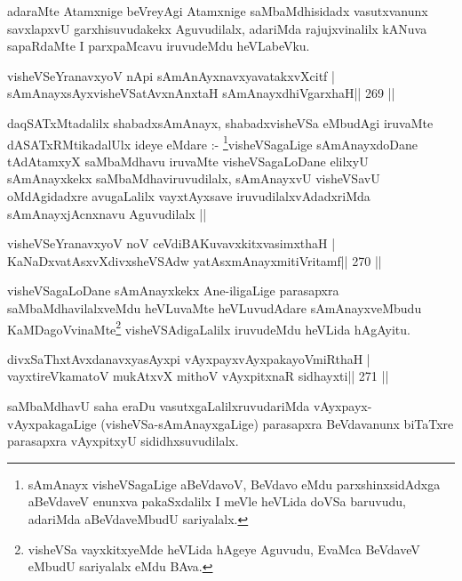 \begin{artha}
adaraMte Atamxnige beVreyAgi Atamxnige saMbaMdhisidadx vasutxvanunx savxlapxvU garxhisuvudakekx Aguvudilalx, adariMda rajujxvinalilx kANuva sapaRdaMte I parxpaMcavu iruvudeMdu heVLabeVku.
\end{artha}

\begin{shl}
visheVSeYranavxyoV nApi sAmAnAyxnavxyavatakxvXcitf |
sAmAnayxsAyxvisheVSatAvxnAnxtaH sAmAnayxdhiVgarxhaH\hfill || 269 ||
\end{shl}

\begin{artha}
daqSATxMtadalilx shabadxsAmAnayx, shabadxvisheVSa eMbudAgi iruvaMte dASATxRMtikadalUlx ideye eMdare :- \footnote[1]{sAmAnayx visheVSagaLige aBeVdavoV, BeVdavo eMdu parxshinxsidAdxga aBeVdaveV enunxva pakaSxdalilx I meVle heVLida doVSa baruvudu, adariMda aBeVdaveMbudU sariyalalx.}visheVSagaLige sAmAnayxdoDane tAdAtamxyX saMbaMdhavu iruvaMte visheVSagaLoDane elilxyU sAmAnayxkekx saMbaMdhaviruvudilalx, sAmAnayxvU visheVSavU oMdAgidadxre avugaLalilx vayxtAyxsave iruvudilalxvAdadxriMda sAmAnayxjAcnxnavu Aguvudilalx || 
\end{artha}


\begin{shl}
visheVSeYranavxyoV noV ceVdiBAKuvavxkitxvasimxthaH |
KaNaDxvatAsxvXdivxsheVSAdw yatAsxmAnayxmitiVritamf\hfill || 270 ||
\end{shl}

\begin{artha}
visheVSagaLoDane sAmAnayxkekx Ane-iligaLige parasapxra saMbaMdhavilalxveMdu heVLuvaMte heVLuvudAdare sAmAnayxveMbudu KaMDagoVvinaMte\footnote[2]{visheVSa vayxkitxyeMde heVLida hAgeye Aguvudu, EvaMca BeVdaveV eMbudU sariyalalx eMdu BAva.} visheVSAdigaLalilx iruvudeMdu heVLida hAgAyitu.
\end{artha}


\begin{shl}
divxSaThxtAvxdanavxyasAyxpi vAyxpayxvAyxpakayoVmiRthaH |
vayxtireVkamatoV mukAtxvX mithoV vAyxpitxnaR sidhayxti\hfill || 271 ||
\end{shl}

\begin{artha}
saMbaMdhavU saha eraDu vasutxgaLalilxruvudariMda vAyxpayx-vAyxpakagaLige (visheVSa-sAmAnayxgaLige) parasapxra BeVdavanunx biTaTxre parasapxra vAyxpitxyU sididhxsuvudilalx.
\end{artha}

